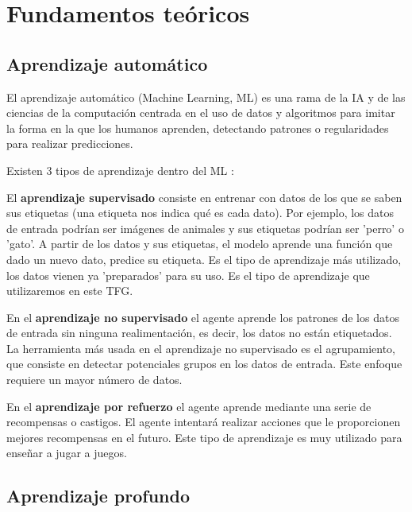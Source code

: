\chapter{Fundamentos teóricos}
\thispagestyle{empty}

\section{Aprendizaje automático}
El aprendizaje automático (Machine Learning, ML) \cite{20,21} es una rama de la IA y de las ciencias de la computación centrada en el uso de datos y algoritmos para imitar la forma en la que los humanos aprenden, detectando patrones o regularidades para realizar predicciones.

Existen 3 tipos de aprendizaje dentro del ML \cite{22,23}:

El \textbf{aprendizaje supervisado} consiste en entrenar con datos de los que se saben sus etiquetas (una etiqueta nos indica qué es cada dato). Por ejemplo, los datos de entrada podrían ser imágenes de animales y sus etiquetas podrían ser 'perro' o 'gato'. A partir de los datos y sus etiquetas, el modelo aprende una función que dado un nuevo dato, predice su etiqueta. Es el tipo de aprendizaje más utilizado, los datos vienen ya 'preparados' para su uso. Es el tipo de aprendizaje que utilizaremos en este TFG.

En el \textbf{aprendizaje no supervisado} el agente aprende los patrones de los datos de entrada sin ninguna realimentación, es decir, los datos no están etiquetados. La herramienta más usada en el aprendizaje no supervisado es el agrupamiento, que consiste en detectar potenciales grupos en los datos de entrada. Este enfoque requiere un mayor número de datos.

En el \textbf{aprendizaje por refuerzo} el agente aprende mediante una serie de recompensas o castigos. El agente intentará realizar acciones que le proporcionen mejores recompensas en el futuro. Este tipo de aprendizaje es muy utilizado para enseñar a jugar a juegos.

\section{Aprendizaje profundo}

